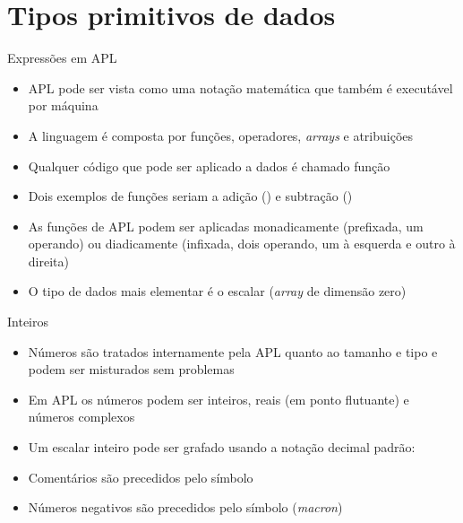 \section{Tipos primitivos de dados}

\begin{frame}[fragile]{Expressões em APL}

    \begin{itemize}
        \item APL pode ser vista como uma notação matemática que também é executável por máquina
        \pause

        \item A linguagem é composta por funções, operadores, \textit{arrays} e atribuições
        \pause

        \item Qualquer código que pode ser aplicado a dados é chamado função 
        \pause

        \item Dois exemplos de funções seriam a adição () e subtração ()
        \pause

        \item As funções de APL podem ser aplicadas monadicamente (prefixada, um operando) ou diadicamente (infixada, dois operando, um à esquerda e outro à direita)
        \pause

        \item O tipo de dados mais elementar é o escalar (\textit{array} de dimensão zero)
    \end{itemize}

\end{frame}

\begin{frame}[fragile]{Inteiros}

    \begin{itemize}
        \item Números são tratados internamente pela APL quanto ao tamanho e tipo e podem ser misturados sem problemas
        \pause

        \item Em APL os números podem ser inteiros, reais (em ponto flutuante) e números complexos
        \pause

        \item Um escalar inteiro pode ser grafado usando a notação decimal padrão:
        \pause

        \item Comentários são precedidos pelo símbolo 
        \pause

        \item Números negativos são precedidos pelo símbolo  (\textit{macron})

    \end{itemize}

\end{frame}


